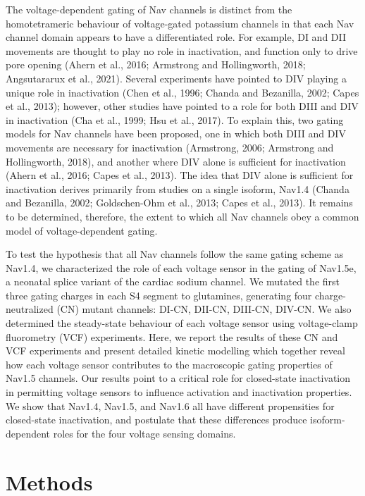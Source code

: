 The voltage-dependent gating of Nav channels is distinct from the homotetrameric behaviour of voltage-gated potassium channels in that each Nav channel domain appears to have a differentiated role. For example, DI and DII movements are thought to play no role in inactivation, and function only to drive pore opening (Ahern et al., 2016; Armstrong and Hollingworth, 2018; Angsutararux et al., 2021). Several experiments have pointed to DIV playing a unique role in inactivation (Chen et al., 1996; Chanda and Bezanilla, 2002; Capes et al., 2013); however, other studies have pointed to a role for both DIII and DIV in inactivation (Cha et al., 1999; Hsu et al., 2017). To explain this, two gating models for Nav channels have been proposed, one in which both DIII and DIV movements are necessary for inactivation (Armstrong, 2006; Armstrong and Hollingworth, 2018), and another where DIV alone is sufficient for inactivation (Ahern et al., 2016; Capes et al., 2013). The idea that DIV alone is sufficient for inactivation derives primarily from studies on a single isoform, Nav1.4 (Chanda and Bezanilla, 2002; Goldschen-Ohm et al., 2013; Capes et al., 2013). It remains to be determined, therefore, the extent to which all Nav channels obey a common model of voltage-dependent gating. 

To test the hypothesis that all Nav channels follow the same gating scheme as Nav1.4, we characterized the role of each voltage sensor in the gating of Nav1.5e, a neonatal splice variant of the cardiac sodium channel. We mutated the first three gating charges in each S4 segment to glutamines, generating four charge-neutralized (CN) mutant channels: DI-CN, DII-CN, DIII-CN, DIV-CN. We also determined the steady-state behaviour of each voltage sensor using voltage-clamp fluorometry (VCF) experiments. Here, we report the results of these CN and VCF experiments and present detailed kinetic modelling which together reveal how each voltage sensor contributes to the macroscopic gating properties of Nav1.5 channels. Our results point to a critical role for closed-state inactivation in permitting voltage sensors to influence activation and inactivation properties. We show that Nav1.4, Nav1.5, and Nav1.6 all have different propensities for closed-state inactivation, and postulate that these differences produce isoform-dependent roles for the four voltage sensing domains.

\section{Methods}
